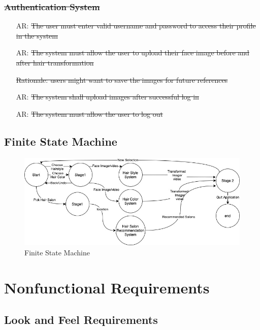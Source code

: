 \documentclass[12pt]{article}
\newcounter{reqnum} %
\newcounter{arreqnum} %
\begin{document}
\subsubsection{\sout{Authentication System}}
    \begin{itemize}
        \item[AR\refstepcounter{arreqnum}\thearreqnum \label{R_Inputs}:] \sout{The user must enter valid username and password to access their profile in the system}
        \item[AR\refstepcounter{arreqnum}\thearreqnum \label{R_Inputs}:] \sout{The system must allow the user to upload their face image before and after hair transformation}
        \item[] \sout{Rationale: users might want to save the images for future references}
        \item[AR\refstepcounter{arreqnum}\thearreqnum \label{R_Inputs}:] \sout{The system shall upload images after successful log in}
        \item[AR\refstepcounter{arreqnum}\thearreqnum \label{R_Inputs}:] \sout{The system must allow the user to log out}
    \end{itemize}

\subsection{Finite State Machine}
\begin{figure}[H]
\begin{center}
 \includegraphics[width=1\textwidth]{fsm_2}
\caption{Finite State Machine}
\end{center}
\end{figure}


\section{Nonfunctional Requirements}

\subsection{Look and Feel Requirements}
\end{document}
